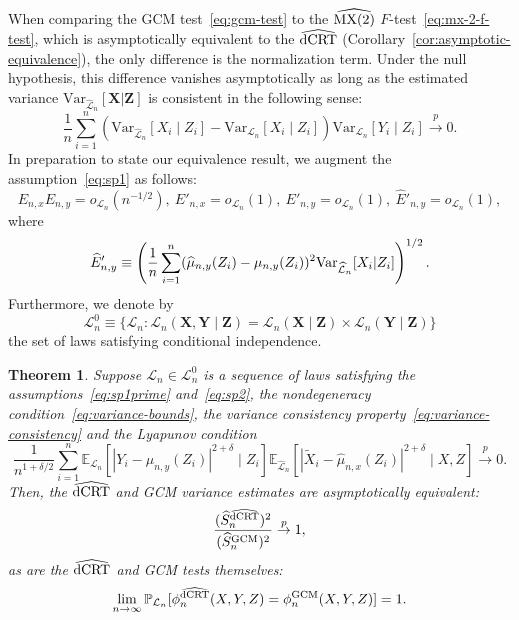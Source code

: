 \documentclass[aos]{imsart}
\theoremstyle{plain}
\newtheorem{theorem}{Theorem}
\theoremstyle{remark}
\newcommand{\E}{\mathbb E}								%
\newcommand{\V}{\mathrm{Var}}							%
\renewcommand{\P}{\mathbb{P}}							%
\newcommand{\convp}{\overset p \rightarrow}             %
\newcommand{\prx}{\bm X}								%
\newcommand{\srx}{X}									%
\newcommand{\prz}{\bm Z}								%
\newcommand{\srz}{Z}									%
\newcommand{\srxk}{\widetilde X}						%
\newcommand{\pry}{{\bm Y}}								%
\newcommand{\sry}{Y}									%
\newcommand{\law}{\mathcal L}							%
\newcommand{\nulllaws}{\mathscr L^0}					%
\newcommand{\lawhat}{\widehat{\mathcal L}}				%
\newcommand{\GCM}{\textnormal{GCM}}						%
\newcommand{\dCRThat}{\widehat{\textnormal{dCRT}}}		%
\newcommand{\MXtwohat}{\widehat{\textnormal{MX(2)}}}	%
\begin{document}
When comparing the GCM test~\eqref{eq:gcm-test} to the $\MXtwohat$ $F$-test~\eqref{eq:mx-2-f-test}, which is asymptotically equivalent to the $\dCRThat$ (Corollary~\ref{cor:asymptotic-equivalence}), the only difference is the normalization term. Under the null hypothesis, this difference vanishes asymptotically as long as the estimated variance $\V_{\lawhat_n}[\prx|\prz]$ is consistent in the following sense:
\begin{equation}
    \frac{1}{n} \sum_{i=1}^n (\V_{\lawhat_n}[\srx_i\mid \srz_i]-\V_{\law_n}[\srx_i\mid \srz_i])\V_{\law_n}[Y_i \mid Z_i] \convp 0.
    \label{eq:variance-consistency}
\end{equation}
In preparation to state our equivalence result, we augment the assumption~\eqref{eq:sp1} as follows:
\begin{equation}
    E_{n, x} E_{n, y}  = o_{\law_n}(n^{-1/2}),\  E'_{n, x} = o_{\law_n}(1),\  E'_{n, y} = o_{\law_n}(1),\ \widehat E'_{n,y} = o_{\law_n}(1),
    \label{eq:sp1prime} \tag{SP1'}
\end{equation}
where
\begin{equation}
    \widehat E'_{n, y} \equiv \left(\frac{1}{n}\sum_{i = 1}^n (\widehat \mu_{n,y}(\srz_i) -  \mu_{n,y}(\srz_i))^2\textnormal{Var}_{\lawhat_n}[\srx_i|\srz_i]\right)^{1/2}.
\end{equation}
Furthermore, we denote by 
\begin{equation}
    \nulllaws_n \equiv \{\law_n: \law_n(\prx, \pry \mid \prz) = \law_n(\prx\mid\prz) \times \law_n(\pry\mid\prz)\}
\end{equation}
the set of laws satisfying conditional independence.
\begin{theorem} \label{thm:equivalence}
    Suppose $\law_n \in \nulllaws_n$ is a sequence of laws satisfying the assumptions~\eqref{eq:sp1prime} and~\eqref{eq:sp2}, the nondegeneracy condition~\eqref{eq:variance-bounds}, the variance consistency property~\eqref{eq:variance-consistency} and the Lyapunov condition 
    \begin{equation}
        \frac{1}{n^{1+\delta/2}} \sum_{i=1}^n \E_{\law_n}\left[|\sry_i-\mu_{n,y}(\srz_i)|^{2+\delta}\mid \srz_i\right]\E_{\lawhat_n}[|\srxk_i-\widehat\mu_{n,x}(\srz_i)|^{2+\delta}\mid \srx,\srz] \convp 0.
        \label{eq:lyapunov-condition-2} \tag{Lyap-2}
    \end{equation}
    Then, the $\dCRThat$ and GCM variance estimates are asymptotically equivalent:
    \begin{equation}
        \frac{(\widehat S_n^{\dCRThat})^2}{(\widehat S_{n}^{\GCM})^2} \convp 1,
        \label{eq:asymptotic-variance-equivalence}
    \end{equation}
    as are the $\dCRThat$ and GCM tests themselves:
    \begin{equation}
        \lim_{n \rightarrow \infty} \P_{\law_n}[\phi^{\dCRThat}_{n}(\srx, \sry, \srz) = \phi^{\GCM}_{n}(\srx, \sry, \srz)] = 1.
        \label{eq:asymptotic-test-equivalence}
    \end{equation}
\end{theorem}
\end{document}
